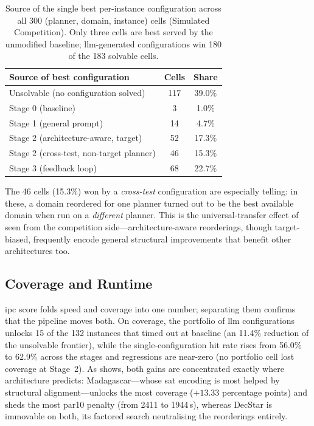 \begin{table}[htbp]
  \centering
  \caption{Source of the single best per-instance configuration across all 300 (planner, domain, instance) cells (Simulated Competition). Only three cells are best served by the unmodified baseline; \gls{llm}-generated configurations win 180 of the 183 solvable cells.}
  \label{tab:cs_source}
  \small
  \begin{tabular}{l c c}
    \toprule
    \textbf{Source of best configuration} & \textbf{Cells} & \textbf{Share} \\
    \midrule
    Unsolvable (no configuration solved)        & 117 & 39.0\% \\
    Stage 0 (baseline)                          & 3   & 1.0\%  \\
    Stage 1 (general prompt)                    & 14  & 4.7\%  \\
    Stage 2 (architecture-aware, target)        & 52  & 17.3\% \\
    Stage 2 (cross-test, non-target planner)    & 46  & 15.3\% \\
    Stage 3 (feedback loop)                     & 68  & 22.7\% \\
    \bottomrule
  \end{tabular}
\end{table}

The 46 cells (15.3\%) won by a \emph{cross-test} configuration are especially telling: in these, a domain reordered for one planner turned out to be the best available domain when run on a \emph{different} planner. This is the universal-transfer effect of  seen from the competition side---architecture-aware reorderings, though target-biased, frequently encode general structural improvements that benefit other architectures too.

\subsection{Coverage and Runtime}
\label{sec:results:cross_stage:coverage}

\gls{ipc} score folds speed and coverage into one number; separating them confirms that the pipeline moves both. On coverage, the portfolio of \gls{llm} configurations unlocks 15 of the 132 instances that timed out at baseline (an 11.4\% reduction of the unsolvable frontier), while the single-configuration hit rate rises from 56.0\% to 62.9\% across the stages and regressions are near-zero (no portfolio cell lost coverage at Stage~2). As  shows, both gains are concentrated exactly where architecture predicts: Madagascar---whose \gls{sat} encoding is most helped by structural alignment---unlocks the most coverage ($+13.33$ percentage points) and sheds the most \gls{par10} penalty (from \num{2411} to \num{1944}\,s), whereas DecStar is immovable on both, its factored search neutralising the reorderings entirely.


